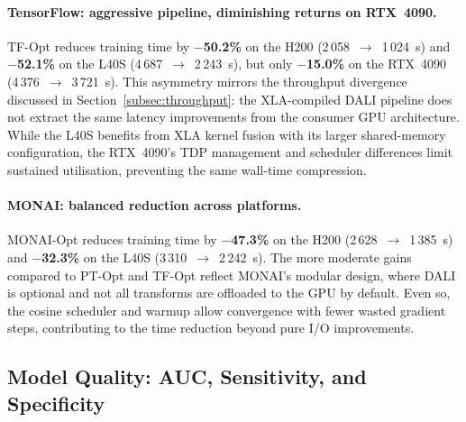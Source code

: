 \paragraph{TensorFlow: aggressive pipeline, diminishing returns on RTX~4090.}
TF-Opt reduces training time by \textbf{$-$50.2\%} on the H200
(2\,058~$\to$~1\,024~s) and \textbf{$-$52.1\%} on the L40S
(4\,687~$\to$~2\,243~s), but only \textbf{$-$15.0\%} on the
RTX~4090 (4\,376~$\to$~3\,721~s).  This asymmetry mirrors the
throughput divergence discussed in Section~\ref{subsec:throughput}: the
XLA-compiled DALI pipeline does not extract the same latency
improvements from the consumer GPU architecture.  While the L40S
benefits from XLA kernel fusion with its larger shared-memory
configuration, the RTX~4090's TDP management and scheduler differences
limit sustained utilisation, preventing the same wall-time
compression.

\paragraph{MONAI: balanced reduction across platforms.}
MONAI-Opt reduces training time by \textbf{$-$47.3\%} on the H200
(2\,628~$\to$~1\,385~s) and \textbf{$-$32.3\%} on the L40S
(3\,310~$\to$~2\,242~s).  The more moderate gains compared to PT-Opt
and TF-Opt reflect MONAI's modular design, where DALI is optional and
not all transforms are offloaded to the GPU by default.  Even so, the
cosine scheduler and warmup allow convergence with fewer wasted
gradient steps, contributing to the time reduction beyond pure I/O
improvements.

\subsection{Model Quality: AUC, Sensitivity, and Specificity}
\label{subsec:quality}


